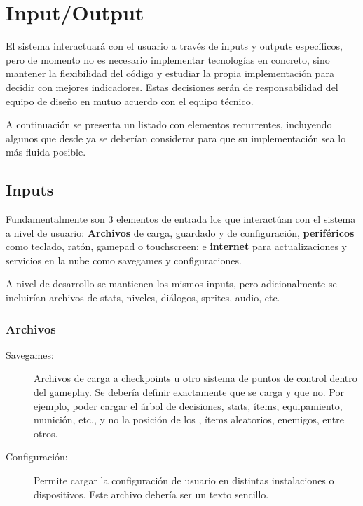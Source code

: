 
\section{Input/Output}\label{io:input-output}

El sistema interactuará con el usuario a través de inputs y outputs específicos, pero de momento no es necesario implementar tecnologías en concreto, sino mantener la flexibilidad del código y estudiar la propia implementación para decidir con mejores indicadores. Estas decisiones serán de responsabilidad del equipo de diseño en mutuo acuerdo con el equipo técnico.

A continuación se presenta un listado con elementos recurrentes, incluyendo algunos que desde ya se deberían considerar para que su implementación sea lo más fluida posible.

\subsection{Inputs}\label{io:inputs}
Fundamentalmente son 3 elementos de entrada los que interactúan con el sistema a nivel de usuario: \textbf{Archivos} de carga, guardado y de configuración, \textbf{periféricos} como teclado, ratón, gamepad o touchscreen; e \textbf{internet} para actualizaciones y servicios en la nube como savegames y configuraciones.

A nivel de desarrollo se mantienen los mismos inputs, pero adicionalmente se incluirían archivos de stats, niveles, diálogos, sprites, audio, etc.

\subsubsection{Archivos}\label{io:inputs-archivos}

\begin{description}
\item[Savegames:] Archivos de carga a checkpoints u otro sistema de puntos de control dentro del gameplay. Se debería definir exactamente que se carga y que no. Por ejemplo, poder cargar el árbol de decisiones, stats, ítems, equipamiento, munición, etc., y no la posición de los , ítems aleatorios, enemigos, entre otros.

\item[Configuración:] Permite cargar la configuración de usuario en distintas instalaciones o dispositivos. Este archivo debería ser un texto sencillo.
\end{description}

